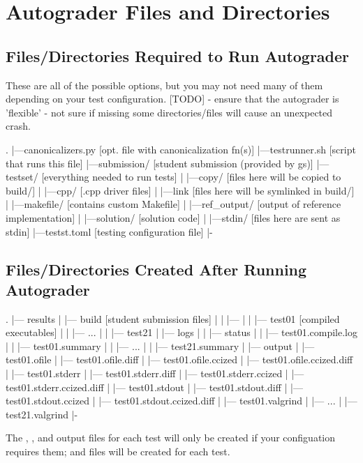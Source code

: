 \documentclass[11pt]{report}
\begin{document}
\section*{Autograder Files and Directories}
\subsection*{Files/Directories Required to Run Autograder}
These are all of the possible options, but you may not need many of them 
depending on your test configuration.
[TODO] - ensure that the autograder is 'flexible' - not sure if missing some directories/files will
cause an unexpected crash.
\begin{bashcodeblock}
.
|---canonicalizers.py [opt. file with canonicalization fn(s)]
|---testrunner.sh     [script that runs this file]
|---submission/       [student submission (provided by gs)]
|---testset/          [everything needed to run tests]
|   |---copy/         [files here will be copied to build/]
|   |---cpp/          [.cpp driver files]
|   |---link          [files here will be symlinked in build/]
|   |---makefile/     [contains custom Makefile]
|   |---ref_output/   [output of reference implementation]
|   |---solution/     [solution code]
|   |---stdin/        [files here are sent as stdin]
|---testst.toml       [testing configuration file]
|-
\end{bashcodeblock}
\newpage
\subsection*{Files/Directories Created After Running Autograder}
\begin{bashcodeblock}
.
|--- results
|   |--- build      [student submission files]
|   |   |--- 
|   |   |--- test01 [compiled executables]
|   |   |--- ...
|   |   |--- test21
|   |--- logs
|   |   |--- status
|   |   |--- test01.compile.log
|   |   |--- test01.summary
|   |   |--- ...
|   |   |--- test21.summary
|   |--- output
|       |--- test01.ofile
|       |--- test01.ofile.diff
|       |--- test01.ofile.ccized
|       |--- test01.ofile.ccized.diff
|       |--- test01.stderr
|       |--- test01.stderr.diff
|       |--- test01.stderr.ccized
|       |--- test01.stderr.ccized.diff 
|       |--- test01.stdout
|       |--- test01.stdout.diff
|       |--- test01.stdout.ccized
|       |--- test01.stdout.ccized.diff
|       |--- test01.valgrind
|       |--- ...
|       |--- test21.valgrind
|-
\end{bashcodeblock}
The , , and  output files for each test 
will only be created if your configuation requires them;  and 
files will be created for each test.
\end{document}
